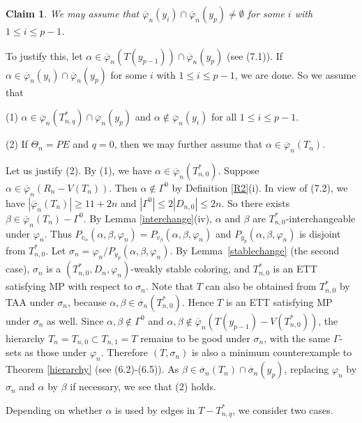 \documentclass[11pt]{article}
\newtheorem{claim}{Claim}[section]
\newcommand{\phibar}{\overline{\varphi}}
\begin{document}
\begin{claim}\label{claim9}
We may assume that $\overline{\varphi}_n(y_i)\cap\overline{\varphi}_n(y_p) \ne \emptyset$ for some $i$ with $1\le i \le p-1$.
\end{claim} 	
\vspace{-1mm}

To justify this, let $\alpha \in \overline{\varphi}_n(T(y_{p-1})) \cap\overline{\varphi}_n(y_p)$ (see 
(7.1)). If $\alpha\in \overline{\varphi}_n(y_i)\cap\overline{\varphi}_n(y_p)$ for some $i$ with $1\le i \le p-1$,
we are done. So we assume that  

(1) $\alpha\in\overline{\varphi}_n(T_{n,q}^*) \cap\overline{\varphi}_n(y_p)$ and $\alpha \notin \overline{\varphi}_n(y_i)$
for all $1 \le i \le p-1$.


(2) If $\Theta_n=PE$ and $q=0$, then we may further assume that $\alpha\in \phibar_n(T_n)$. 

Let us justify (2).
By (1), we have $\alpha\in \phibar_n(T_{n,0}^*)$. Suppose $\alpha\in \phibar_n(R_n-V(T_n))$. Then $\alpha\notin\Gamma^{0}$ by Definition \ref{R2}(i). In view of (7.2), we have $|\phibar_n(T_n)|\geq 11+2n$ and $|\Gamma^{0}|\leq 2 |D_{n,0}| \le 2n$. 
So there exists $\beta\in\phibar_n(T_n)-\Gamma^{0}$. By Lemma \ref{interchange}(iv), $\alpha$ and $\beta$ are $T_{n,0}^*$-interchangeable under $\varphi_n$. Thus $P_{v_{\alpha}}(\alpha,\beta,\varphi_n)=P_{v_{\beta}}(\alpha,\beta,\varphi_n)$ 
and $P_{y_p}(\alpha,\beta,\varphi_n)$ is disjoint from $T_{n,0}^*$. Let $\sigma_n=\varphi_n/P_{y_p}(\alpha,\beta,\varphi_n)$.
By Lemma~\ref{stablechange} (the second case), $\sigma_n$ is a $(T_{n,0}^*, D_n,\varphi_n)$-weakly stable coloring, 
and $T_{n,0}^*$ is an ETT satisfying MP with respect to $\sigma_n$. Note that $T$ can also be obtained from $T_{n,0}^*$ by 
TAA under $\sigma_n$, because $\alpha,\beta \in \overline{\sigma}_n(T_{n,0}^*)$. Hence $T$ is an ETT satisfying MP under $\sigma_n$ as 
well. Since $\alpha,\beta\notin \Gamma^{0}$ and $\alpha,\beta\notin \phibar_n(T(y_{p-1})-V(T_{n,0}^*))$, the hierarchy
$T_n=T_{n,0} \subset T_{n,1}=T$ remains to be good under $\sigma_n$, with the same $\Gamma$-sets
as those under $\varphi_n$. Therefore $(T, \sigma_n)$ is also a minimum counterexample to Theorem \ref{hierarchy} (see 
(6.2)-(6.5)). As $\beta\in \overline{\sigma}_n(T_n) \cap \overline{\sigma}_n(y_p)$, replacing $\varphi_n$ by $\sigma_n$ 
and $\alpha$ by $\beta$ if necessary, we see that (2) holds.

Depending on whether $\alpha$ is used by edges in $T -  T_{n,q}^*$, we consider two cases.
\end{document}
